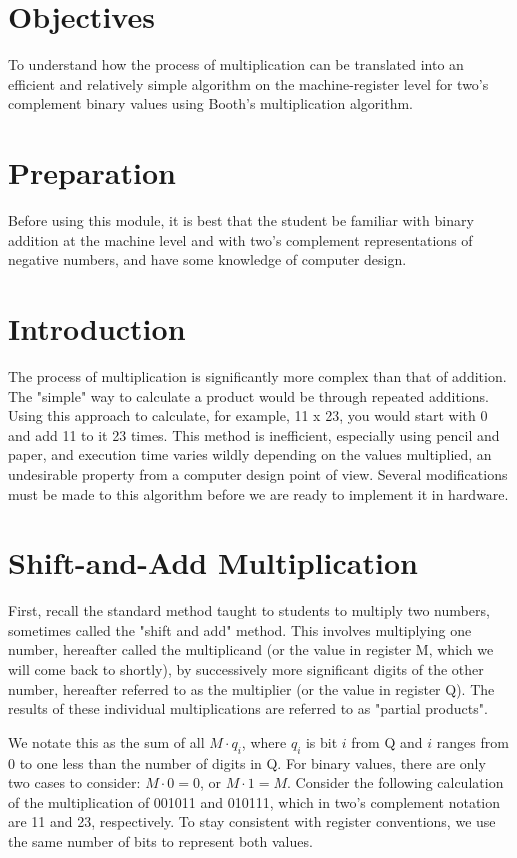 \documentclass{article}
\begin{document}
\section{Objectives}
To understand how the process of multiplication can be translated into an efficient and relatively simple algorithm on the machine-register level for two's complement binary values using Booth's multiplication algorithm.

\section{Preparation}
Before using this module, it is best that the student be familiar with binary addition at the machine level and with two's complement representations of negative numbers, and have some knowledge of computer design.

\section{Introduction}
The process of multiplication is significantly more complex than that of addition.
The "simple" way to calculate a product would be through repeated additions.
Using this approach to calculate, for example, 11 x 23, you would start with 0 and add 11 to it 23 times.
This method is inefficient, especially using pencil and paper, and execution time varies wildly depending on the values multiplied, an undesirable property from a computer design point of view.
Several modifications must be made to this algorithm before we are ready to implement it in hardware.

\section{Shift-and-Add Multiplication}
First, recall the standard method taught to students to multiply two numbers, sometimes called the "shift and add" method.
This involves multiplying one number, hereafter called the multiplicand (or the value in register M, which we will come back to shortly), by successively more significant digits of the other number, hereafter referred to as the multiplier (or the value in register Q).
The results of these individual multiplications are referred to as "partial products".

We notate this as the sum of all $M \cdot q_i$, where $q_i$ is bit $i$ from Q and $i$ ranges from 0 to one less than the number of digits in Q.
For binary values, there are only two cases to consider: $M \cdot 0 = 0$, or $M \cdot 1 = M$.
Consider the following calculation of the multiplication of 001011 and 010111, which in two's complement notation are 11 and 23, respectively.
To stay consistent with register conventions, we use the same number of bits to represent both values.
\end{document}
